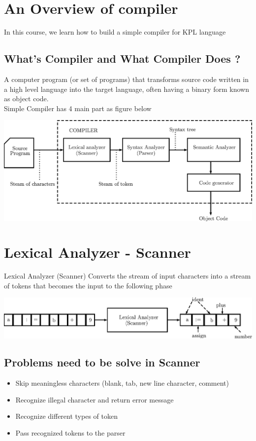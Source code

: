 \documentclass[12pt, a4paper]{article}
\begin{document}
\section{An Overview of compiler}
In this course, we learn how to build a simple compiler for KPL language
\subsection*{What's Compiler and What Compiler Does ?}
A computer program (or set of programs) that transforms source code written in a high level language into the target language, often having a binary form known as object code. \\
Simple Compiler has 4 main part as figure below
\begin{center}
	\includegraphics[width=14cm]{compiler_diagram}
\end{center}
\section{Lexical Analyzer - Scanner}
Lexical Analyzer (Scanner) Converts the stream of input characters into a stream of tokens that becomes the input to the following phase\\

\begin{center}
	\includegraphics[width=15cm]{lex}
\end{center}
\clearpage
\subsection*{Problems need to be solve in Scanner}
\begin{itemize}
	\item Skip meaningless characters (blank, tab, new line character, comment)
	\item Recognize illegal character and return error message
	\item Recognize different types of token
	\item Pass recognized tokens to the parser 
\end{itemize}
\end{document}
